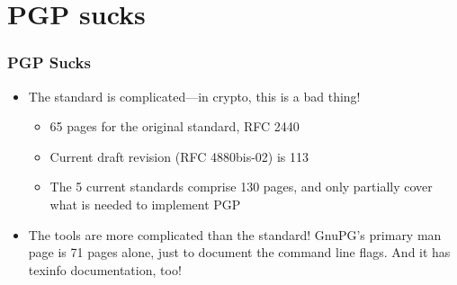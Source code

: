 \documentclass[aspectratio=1610,bigger,utf8]{beamer}
\begin{document}
\section{PGP sucks}
\begin{frame}
	\frametitle{PGP Sucks}
	\begin{itemize}
		\item The standard is complicated---in crypto, this is a bad thing!
			\begin{itemize}
				\item 65 pages for the original standard, RFC 2440
				\item Current draft revision 
					(\alert{RFC 4880bis-02}) is 113
				\item The 5 current standards comprise 130
					pages, and only partially cover what is
					needed to implement PGP
			\end{itemize}
		\item The \alert{tools} are more complicated than the standard!
			GnuPG's primary man page is 71 pages alone, just to
			document the command line flags. And it has texinfo
			documentation, too!
	\end{itemize}
\end{frame}
\end{document}
